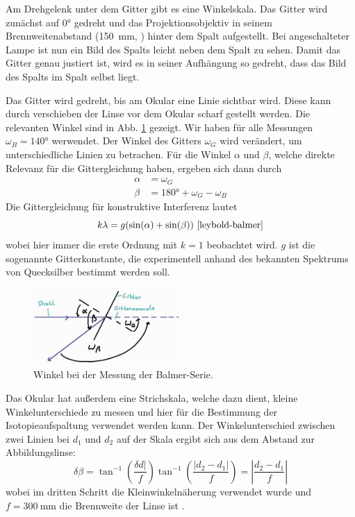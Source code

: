 \documentclass{article}
\begin{document}
Am Drehgelenk unter dem Gitter gibt es eine Winkelskala. Das Gitter wird zunächst auf \ang{0} gedreht und das Projektionsobjektiv in seinem Brennweitenabstand
(\SI{150}{\mm}, \cite{Anleitung}) hinter dem Spalt aufgestellt. Bei angeschalteter Lampe ist nun ein Bild des Spalts leicht neben dem Spalt zu sehen.
Damit das Gitter genau justiert ist, wird es in seiner Aufhängung so gedreht, dass das Bild des Spalts im Spalt selbst liegt.

Das Gitter wird gedreht, bis am Okular eine Linie sichtbar wird. Diese kann durch verschieben der Linse vor dem Okular scharf gestellt werden.
Die relevanten Winkel sind in Abb. \ref{fig:balmer-winkel} gezeigt. Wir haben für alle Messungen $\omega_B = \ang{140}$ werwendet.
Der Winkel des Gitters $\omega_G$ wird verändert, um unterschiedliche Linien zu betrachen. Für die Winkel $\alpha$ und $\beta$, welche
direkte Relevanz für die Gittergleichung haben, ergeben sich dann durch
\begin{align}
  \alpha &= \omega_G \nonumber \\
  \beta &= \ang{180} + \omega_G - \omega_B \label{eq:balmer-winkel}
\end{align}
Die Gittergleichung für konstruktive Interferenz lautet
\begin{equation}
  k\lambda = g(\sin(\alpha) + \sin(\beta)) \label{eq:gittergleichung}\ \cite{leybold-balmer}
\end{equation}
wobei hier immer die erste Ordnung mit $k=1$ beobachtet wird. $g$ ist die sogenannte Gitterkonstante,
die experimentell anhand des bekannten Spektrums von Quecksilber bestimmt werden soll.

\begin{figure}[h]
  \centering
  \includegraphics[width=0.5\textwidth]{balmer-winkel}
  \caption{Winkel bei der Messung der Balmer-Serie.}
  \label{fig:balmer-winkel}
\end{figure}

Das Okular hat außerdem eine Strichskala, welche dazu dient, kleine Winkelunterschiede zu messen und
hier für die Bestimmung der Isotopieaufspaltung verwendet werden kann.
Der Winkelunterschied zwischen zwei Linien bei $d_1$ und $d_2$ auf der Skala ergibt sich aus dem Abstand zur Abbildungslinse:
\begin{equation}
  \delta \beta = \tan^{-1}\left(\frac{\delta d \rvert}{f}\right) \tan^{-1}\left(\frac{\lvert d_2-d_1 \rvert}{f}\right) = \left\lvert \frac{d_2-d_1}{f} \right\rvert \label{eq:winkelunterschied}
\end{equation}
wobei im dritten Schritt die Kleinwinkelnäherung verwendet wurde und $f=\SI{300}{\mm}$ die Brennweite der Linse ist \cite{Anleitung}.
\end{document}
